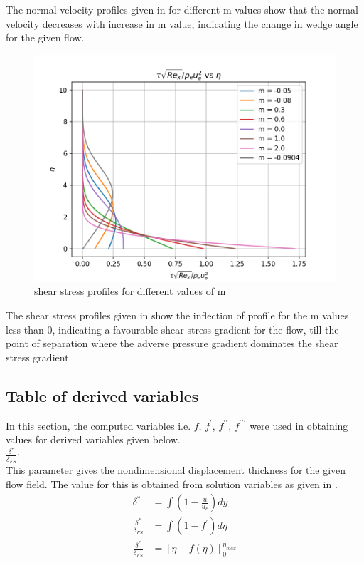 \par The normal velocity profiles given in  for different m values
show that the normal velocity decreases with increase in m value, indicating
the change in wedge angle for the given flow.\\

\begin{figure}[!h]
   \centering
    \includegraphics[scale=0.5]{supporting_documents/02_question_2_and_3_codeDevelopment/03_postProcessing/plot_3.png}
    \caption{shear stress profiles for different values of m}
    \label{plot_3}
\end{figure}

\par The shear stress profiles given in  show the inflection of
profile for the m values less than 0, indicating a favourable shear stress
gradient for the flow, till the point of separation where the adverse pressure
gradient dominates the shear stress gradient.

\pagebreak

\subsection{Table of derived variables}

\par In this section, the computed variables i.e. $f$, $f^{\prime}$, $f^{\prime\prime}$, $f^{\prime\prime\prime}$
were used in obtaining values for derived variables given below.\\

\(\frac{\delta^*}{\delta_{FS}}\): \\
This parameter gives the nondimensional displacement thickness for the given
flow field. The value for this is obtained from solution variables as given
in .
\begin{align}
    \delta^* &= \int{}{} \left(1 - \frac{u}{u_e}\right) dy \nonumber \\
    \frac{\delta^*}{\delta_{FS}} &= \int{}{}\left( 1 - f^{\prime}\right) d\eta \nonumber \\
    \frac{\delta^*}{\delta_{FS}} &= \left[\eta - f(\eta)\right]_0^{\eta_{max}} \label{d_star_dFS}
\end{align}

